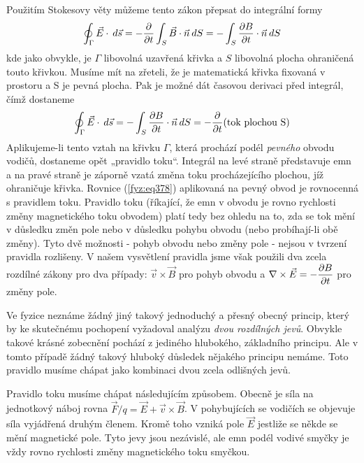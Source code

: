 {  Použitím Stokesovy věty můžeme tento zákon přepsat do integrální formy
  \begin{equation}\label{fyz:eq379}
    \oint_\Gamma\vec{E}\cdot\hspace{2pt}d\vec{s} 
      = -\dfrac{\partial  }{\partial t}\int_S\vec{B}\cdot\vec{n}\hspace{2pt}dS = -\int_S\dfrac{\partial B}{\partial t}\cdot\vec{n}\hspace{2pt}dS
  \end{equation}
  kde jako obvykle, je \(\Gamma\) libovolná uzavřená křivka a \(S\) libovolná plocha ohraničená 
  touto křivkou. Musíme mít na zřeteli, že je matematická křivka fixovaná v prostoru a S je pevná 
  plocha. Pak je možné dát časovou derivaci před integrál, čímž dostaneme
  \begin{equation}\label{fyz:eq380}
    \oint_\Gamma\vec{E}\cdot\hspace{2pt}d\vec{s} 
      = -\int_S\dfrac{\partial B}{\partial t}\cdot\vec{n}\hspace{2pt}dS = -\dfrac{\partial  }{\partial t}(\text{tok plochou S})
  \end{equation}
  Aplikujeme-li tento vztah na křivku \(\Gamma\), která prochází podél \emph{pevného} obvodu 
  vodičů, dostaneme opět „pravidlo toku“. Integrál na levé straně představuje emn a na pravé straně 
  je záporně vzatá změna toku procházejícího plochou, jíž ohraničuje křivka. Rovnice 
  (\ref{fyz:eq378}) aplikovaná na pevný obvod je rovnocenná s pravidlem toku. Pravidlo toku 
  (říkající, že emn v obvodu je rovno rychlosti změny magnetického toku obvodem) platí tedy bez 
  ohledu na to, zda se tok mění v důsledku změn pole nebo v důsledku pohybu obvodu (nebo 
  probíhají-li obě změny). Tyto dvě možnosti - pohyb obvodu nebo změny pole - nejsou v tvrzení 
  pravidla rozlišeny. V našem vysvětlení pravidla jsme však použili dva zcela rozdílné zákony pro 
  dva případy: \(\vec{v}\times\vec{B}\) pro pohyb obvodu a \(\nabla\times\vec{E} = -\dfrac{\partial B}{\partial t}\) 
  pro změny pole.
  
  Ve fyzice neznáme žádný jiný takový jednoduchý a přesný obecný princip, který by ke skutečnému 
  pochopení vyžadoval analýzu \emph{dvou rozdílných jevů}. Obvykle takové krásné zobecnění pochází 
  z jediného hlubokého, základního principu. Ale v tomto případě žádný takový hluboký důsledek 
  nějakého principu nemáme. Toto pravidlo musíme chápat jako kombinaci dvou zcela odlišných jevů.
  
  Pravidlo toku musíme chápat následujícím způsobem. Obecně je síla na jednotkový náboj rovna 
  \(\vec{F}/q = \vec{E}+\vec{v}\times\vec{B}\). V pohybujících se vodičích se objevuje síla 
  vyjádřená druhým členem. Kromě toho vzniká pole \(\vec{E}\) jestliže se někde se mění magnetické 
  pole. Tyto jevy jsou nezávislé, ale emn podél vodivé smyčky je vždy rovno rychlosti změny 
  magnetického toku smyčkou.
  
}
